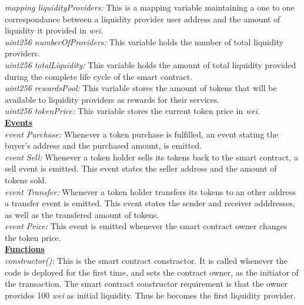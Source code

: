 \documentclass[12pt,a4paper]{article}
\begin{document}
\emph{mapping liquidityProviders:} This is a mapping variable maintaining a one
to one correspondance between a liquidity provider user address and the amount
of liquidity it provided in \emph{wei}. \\

\emph{uint256 numberOfProviders:} This variable holds the number of total
liquidity providers.\\

\emph{uint256 totalLiquidity:} This variable holds the amount of total liquidity
provided during the complete life cycle of the smart contract.\\

\emph{uint256 rewardsPool:} This variable stores the amount of tokens that will
be available to liquidity providers as rewards for their services.\\

\emph{uint256 tokenPrice:} This variable stores the current token price in
\emph{wei}.\\

\textbf{\underline{Events}} \\

\emph{event Purchase:} Whenever a token purchase is fulfilled, an event stating
the buyer's address and the purchased amount, is emitted.\\

\emph{event Sell:} Whenever a token holder sells its tokens back to the smart
contract, a sell event is emitted. This event states the seller address and the
amount of tokens sold.\\

\emph{event Transfer:} Whenever a token holder transfers its tokens to an other
address a transfer event is emitted. This event states the sender and receiver
adddresses, as well as the transfered amount of tokens.\\

\emph{event Price:} This event is emitted whenever the smart contract owner
changes the token price.\\

\textbf{\underline{Functions}} \\

\emph{constructor():} This is the smart contract constractor. It is called
whenever the code is deployed for the first time, and sets the contract owner,
as the initiator of the transaction. The smart contract constructor requirement
is that the owner provides 100 \emph{wei} as initial liquidity. Thus he becomes
the first liquidity provider.\\
\end{document}
